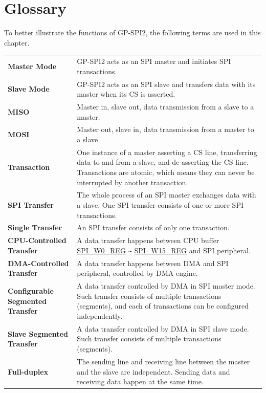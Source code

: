 \section{Glossary}

To better illustrate the functions of GP-SPI2, the following terms are used in this chapter. 

\begin{longtable}[c]{ R{7cm} p{10cm} }

\textbf{Master Mode}     & GP-SPI2 acts as an SPI master and initiates SPI transactions. \\ 
\textbf{Slave Mode}      & GP-SPI2 acts as an SPI slave and transfers data with its master when its CS is asserted.\\
\textbf{MISO}       & Master in, slave out, data transmission from a slave to a master.\\
\textbf{MOSI}  & Master out, slave in, data transmission from a master to a slave \\ 
\textbf{Transaction} & One instance of a master asserting a CS line, transferring data to and from a slave, and de-asserting the CS line. Transactions are atomic, which means they can never be interrupted by another transaction.\\
\textbf{SPI Transfer} & The whole process of an SPI master exchanges data with a slave. One SPI transfer consists of one or more SPI transactions.\\
\textbf{Single Transfer} & An SPI transfer consists of only one transaction. \\
\textbf{CPU-Controlled Transfer}& A data transfer happens between CPU buffer \hyperref[regdesc:SPIW0REG]{SPI\_W0\_REG} \verb+~+ \hyperref[regdesc:SPIW15REG]{SPI\_W15\_REG} and SPI peripheral.\\
\textbf{DMA-Controlled Transfer}& A data transfer happens between DMA and SPI peripheral, controlled by DMA engine.\\
\textbf{Configurable Segmented Transfer}& A data transfer controlled by DMA in SPI master mode. Such transfer consists of multiple transactions (segments), and each of transactions can be configured independently.\\
\textbf{Slave Segmented Transfer} & A data transfer controlled by DMA in SPI slave mode. Such transfer consists of multiple transactions (segments).\\
\textbf{Full-duplex} & The sending line and receiving line between the master and the slave are independent. Sending data and receiving data happen at the same time. \\

\end{longtable}
